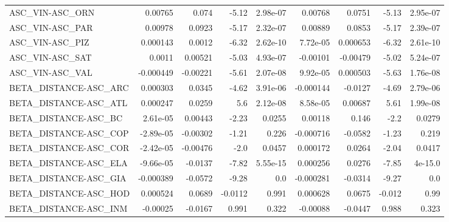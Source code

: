 \begin{tabular}{lrrrrrrrr}
ASC\_VIN-ASC\_ORN                        &     0.00765 &        0.074 &   -5.12 & 2.98e-07 &    0.00768 &      0.0751 &        -5.13 &      2.95e-07 \\
ASC\_VIN-ASC\_PAR                        &     0.00978 &       0.0923 &   -5.17 & 2.32e-07 &    0.00889 &      0.0853 &        -5.17 &      2.39e-07 \\
ASC\_VIN-ASC\_PIZ                        &    0.000143 &       0.0012 &   -6.32 & 2.62e-10 &   7.72e-05 &    0.000653 &        -6.32 &      2.61e-10 \\
ASC\_VIN-ASC\_SAT                        &      0.0011 &      0.00521 &   -5.03 & 4.93e-07 &   -0.00101 &    -0.00479 &        -5.02 &      5.24e-07 \\
ASC\_VIN-ASC\_VAL                        &   -0.000449 &     -0.00221 &   -5.61 & 2.07e-08 &   9.92e-05 &    0.000503 &        -5.63 &      1.76e-08 \\
BETA\_DISTANCE-ASC\_ARC                  &    0.000303 &       0.0345 &   -4.62 & 3.91e-06 &  -0.000144 &     -0.0127 &        -4.69 &      2.79e-06 \\
BETA\_DISTANCE-ASC\_ATL                  &    0.000247 &       0.0259 &     5.6 & 2.12e-08 &   8.58e-05 &     0.00687 &         5.61 &      1.99e-08 \\
BETA\_DISTANCE-ASC\_BC                   &    2.61e-05 &      0.00443 &   -2.23 &   0.0255 &    0.00118 &       0.146 &         -2.2 &        0.0279 \\
BETA\_DISTANCE-ASC\_COP                  &   -2.89e-05 &     -0.00302 &   -1.21 &    0.226 &  -0.000716 &     -0.0582 &        -1.23 &         0.219 \\
BETA\_DISTANCE-ASC\_COR                  &   -2.42e-05 &     -0.00476 &    -2.0 &   0.0457 &   0.000172 &      0.0264 &        -2.04 &        0.0417 \\
BETA\_DISTANCE-ASC\_ELA                  &   -9.66e-05 &      -0.0137 &   -7.82 & 5.55e-15 &   0.000256 &      0.0276 &        -7.85 &       4e-15.0 \\
BETA\_DISTANCE-ASC\_GIA                  &   -0.000389 &      -0.0572 &   -9.28 &      0.0 &  -0.000281 &     -0.0314 &        -9.27 &           0.0 \\
BETA\_DISTANCE-ASC\_HOD                  &    0.000524 &       0.0689 & -0.0112 &    0.991 &   0.000628 &      0.0675 &       -0.012 &          0.99 \\
BETA\_DISTANCE-ASC\_INM                  &    -0.00025 &      -0.0167 &   0.991 &    0.322 &   -0.00088 &     -0.0447 &        0.988 &         0.323 \\

\end{tabular}

